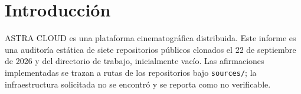 \chapter{Introducción} ASTRA CLOUD es una plataforma cinematográfica distribuida. Este informe es una auditoría estática de siete repositorios públicos clonados el 22 de septiembre de 2026 y del directorio de trabajo, inicialmente vacío. Las afirmaciones implementadas se trazan a rutas de los repositorios bajo \texttt{sources/}; la infraestructura solicitada no se encontró y se reporta como no verificable.
